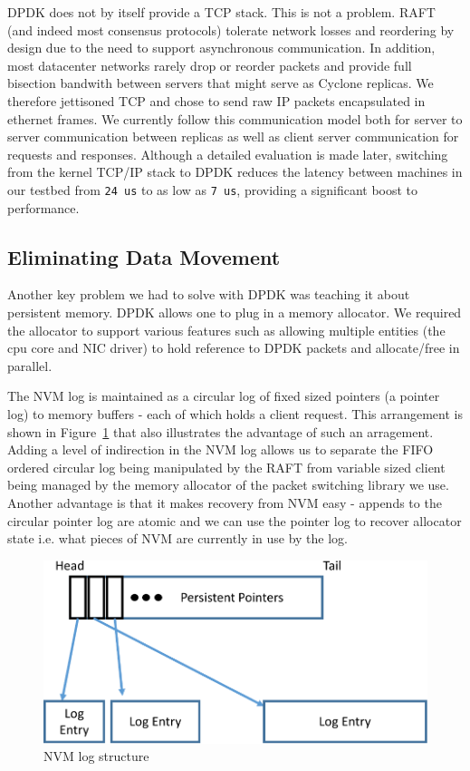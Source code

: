\documentclass[pageno]{jpaper}
\begin{document}
DPDK does not by itself provide a TCP stack. This is not a problem. RAFT (and
indeed most consensus protocols) tolerate network losses and reordering by
design due to the need to support asynchronous communication. In addition, most
datacenter networks rarely drop or reorder packets and provide full bisection
bandwith between servers that might serve as Cyclone replicas. We therefore
jettisoned TCP and chose to send raw IP packets encapsulated in ethernet
frames. We currently follow this communication model both for server to server
communication between replicas as well as client server communication for
requests and responses. Although a detailed evaluation is made later, switching
from the kernel TCP/IP stack to DPDK reduces the latency between machines in our
testbed from {\tt 24 us} to as low as {\tt 7 us}, providing a significant boost
to performance.

\subsection{Eliminating Data Movement}


Another key problem we had to solve with DPDK was teaching it about persistent
memory. DPDK allows one to plug in a memory allocator. We required the allocator
to support various features such as allowing multiple entities (the cpu core and
NIC driver) to hold reference to DPDK packets and allocate/free in parallel. 

The NVM log is maintained as a circular log of fixed sized pointers (a pointer
log) to memory buffers - each of which holds a client request. This arrangement
is shown in Figure~\ref{fig:nvm_log} that also illustrates the advantage of such
an arragement. Adding a level of indirection in the NVM log allows us to
separate the FIFO ordered circular log being manipulated by the RAFT from
variable sized client being managed by the memory allocator of the packet
switching library we use. Another advantage is that it makes recovery from NVM
easy - appends to the circular pointer log are atomic and we can use the pointer
log to recover allocator state i.e. what pieces of NVM are currently in use by
the log.

\begin{figure}
\centering
\includegraphics[scale=0.3]{figures2/nvm_log.pdf}
\caption{NVM log structure}
\label{fig:nvm_log}
\end{figure}
\end{document}
